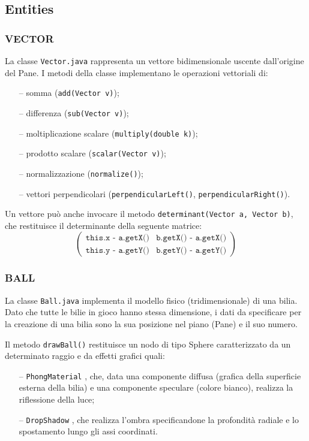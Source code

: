 \documentclass[12pt,a4paper]{report}
\begin{document}
\subsection{Entities} \label{se:Entities} %

\subsubsection*{VECTOR}
La classe \texttt{Vector.java} rappresenta un vettore bidimensionale uscente dall'origine del Pane.
I metodi della classe implementano le operazioni vettoriali di:
\begin{itemize}
	\item [--] somma (\texttt{add(Vector v)});
	\item [--] differenza (\texttt{sub(Vector v)});
	\item [--] moltiplicazione scalare (\texttt{multiply(double k)});
	\item [--] prodotto scalare (\texttt{scalar(Vector v)});
	\item [--] normalizzazione (\texttt{normalize()});
	\item [--] vettori perpendicolari (\texttt{perpendicularLeft()}, \texttt{perpendicularRight()}).
\end{itemize}
Un vettore può anche invocare il metodo \texttt{determinant(Vector a, Vector b)}, che restituisce il determinante della seguente matrice:
\[
\begin{pmatrix}
\texttt{this.x - a.getX()} & \texttt{b.getX() - a.getX()}\\
\texttt{this.y - a.getY()} & \texttt{b.getY() - a.getY()}
\end{pmatrix}
\]

\vspace{3mm}

\subsubsection*{BALL}
La classe \texttt{Ball.java} implementa il modello fisico (tridimensionale) di una bilia.
Dato che tutte le bilie in gioco hanno stessa dimensione, i dati da specificare per la creazione di una bilia sono la sua posizione nel piano (Pane) e il suo numero.

\vspace{3mm}

Il metodo \texttt{drawBall()} restituisce un nodo di tipo Sphere caratterizzato da un determinato raggio e da effetti grafici quali:
\begin{itemize}
	\item [--] \texttt{PhongMaterial} \cite{PhongMaterial}, che, data una componente diffusa (grafica della superficie esterna della bilia) e una componente speculare (colore bianco), realizza la riflessione della luce;
	\item [--] \texttt{DropShadow} \cite{DropShadow}, che realizza l'ombra specificandone la profondità radiale e lo spostamento lungo gli assi coordinati.
\end{itemize}
\end{document}

